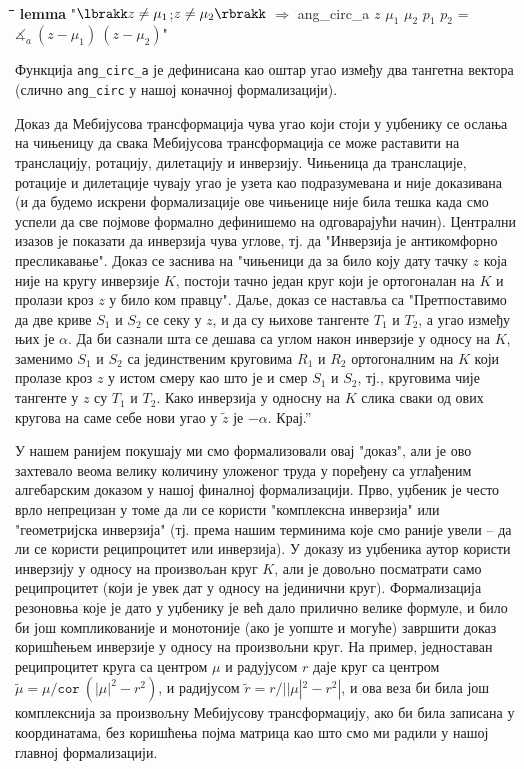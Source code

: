 {\tt
  \begin{tabbing}
    \hspace{5mm}\=\hspace{5mm}\=\hspace{5mm}\=\hspace{5mm}\=\hspace{5mm}\=\kill
{\bf lemma} "$\lbrakk z \neq \mu_1$;$z \neq \mu_2\rbrakk$ $\Longrightarrow$ ang\_circ\_a $z$ $\mu_1$ $\mu_2$ $p_1$ $p_2$ = $\measuredangle_a\ (z - \mu_1)\ (z - \mu_2)$"
\end{tabbing}
}
\noindent Функција {\tt ang\_circ\_a} је дефинисана као оштар угао
између два тангетна вектора (слично {\tt ang\_circ} у нашој коначној
формализацији).

Доказ да Мебијусова трансформација чува угао који стоји у уџбенику
\cite{needham} се ослања на чињеницу да свака Мебијусова
трансформација се може раставити на транслацију, ротацију, дилетацију
и инверзију. Чињеница да транслације, ротације и дилетације чувају
угао је узета као подразумевана и није доказивана (и да будемо искрени
формализације ове чињенице није била тешка када смо успели да све
појмове формално дефинишемо на одговарајући начин). Централни изазов
је показати да инверзија чува углове, тј. да "Инверзија је
антикомфорно пресликавање".  Доказ се заснива на "чињеници да за било
коју дату тачку $z$ која није на кругу инверзије $K$, постоји тачно
један круг који је ортогоналан на $K$ и пролази кроз $z$ у било ком
правцу". Даље, доказ се наставља са "Претпоставимо да две криве $S_1$
и $S_2$ се секу у $z$, и да су њихове тангенте $T_1$ и $T_2$, а угао
између њих је $\alpha$. Да би сазнали шта се дешава са углом након
инверзије у односу на $K$, заменимо $S_1$ и $S_2$ са јединственим
круговима $R_1$ и $R_2$ ортогоналним на $K$ који пролазе кроз $z$ у
истом смеру као што је и смер $S_1$ и $S_2$, тј., круговима чије
тангенте у $z$ су $T_1$ и $T_2$. Како инверзија у односну на $K$ слика
сваки од ових кругова на саме себе нови угао у $\tilde{z}$ је
$-\alpha$. Крај.''

У нашем ранијем покушају ми смо формализовали овај "доказ", али је ово
захтевало веома велику количину уложеног труда у поређену са углађеним
алгебарским доказом у нашој финалној формализацији.  Прво, уџбеник је
често врло непрецизан у томе да ли се користи "комплексна инверзија"
или "геометријска инверзија" (тј. према нашим терминима које смо
раније увели -- да ли се користи реципроцитет или инверзија). У доказу
из уџбеника аутор користи инверзију у односу на произвољан круг $K$,
али је довољно посматрати само реципроцитет (који је увек дат у односу
на јединични круг). Формализација резоновња које је дато у уџбенику је
већ дало прилично велике формуле, и било би још компликованије и
монотоније (ако је уопште и могуће) завршити доказ коришћењем
инверзије у односу на произвољни круг. На пример, једноставан
реципроцитет круга са центром $\mu$ и радујусом $r$ даје круг са
центром $\tilde{\mu} = \mu / \mathtt{cor}\ (|\mu|^2 - r^2)$, и
радијусом $\tilde{r} = r / ||\mu|^2 - r^2|$, и ова веза би била још
комплекснија за произвољну Мебијусову трансформацију, ако би била
записана у координатама, без коришћења појма матрица као што смо ми
радили у нашој главној формализацији.

